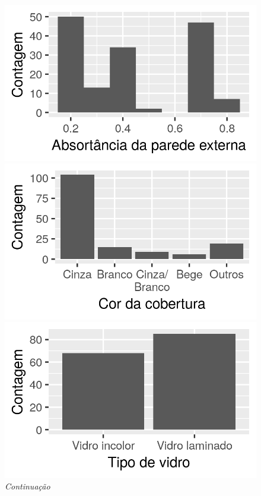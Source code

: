 \documentclass[brazil,hardcopy,openany,a4paper]{ufscthesis}
\begin{document}
	\begin{figure}
		\ContinuedFloat
		\caption[]{\textit{Continuação}} %
		\centering	
		\begin{minipage}{.5\textwidth}
			\centering
			\includegraphics[width=\linewidth]{img/hist_absortancia.png}
		\end{minipage}%
		\begin{minipage}{.5\textwidth}
			\centering
			\includegraphics[width=\linewidth]{img/hist_cor_cobertura.png}
		\end{minipage}
		\centering	
		\begin{minipage}{.5\textwidth}
			\centering
			\includegraphics[width=\linewidth]{img/hist_tipo_vidro.png}

\end{minipage}
\end{figure}
\end{document}
